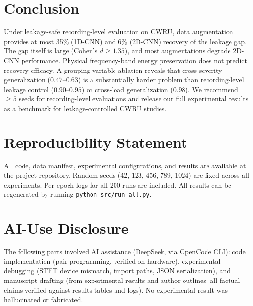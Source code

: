 ﻿\documentclass[11pt,a4paper]{article}
\begin{document}
\section{Conclusion}

Under leakage-safe recording-level evaluation on CWRU, data augmentation provides at most 35\% (1D-CNN) and 6\% (2D-CNN) recovery of the leakage gap. The gap itself is large (Cohen's $d \geq 1.35$), and most augmentations degrade 2D-CNN performance. Physical frequency-band energy preservation does not predict recovery efficacy. A grouping-variable ablation reveals that cross-severity generalization ($0.47$--$0.63$) is a substantially harder problem than recording-level leakage control ($0.90$--$0.95$) or cross-load generalization ($0.98$). We recommend $\geq 5$ seeds for recording-level evaluations and release our full experimental results as a benchmark for leakage-controlled CWRU studies.

\section{Reproducibility Statement}

All code, data manifest, experimental configurations, and results are available at the project repository. Random seeds (42, 123, 456, 789, 1024) are fixed across all experiments. Per-epoch logs for all 200 runs are included. All results can be regenerated by running \texttt{python src/run\_all.py}.

\section{AI-Use Disclosure}

The following parts involved AI assistance (DeepSeek, via OpenCode CLI): code implementation (pair-programming, verified on hardware), experimental debugging (STFT device mismatch, import paths, JSON serialization), and manuscript drafting (from experimental results and author outlines; all factual claims verified against results tables and logs). No experimental result was hallucinated or fabricated.
\end{document}
